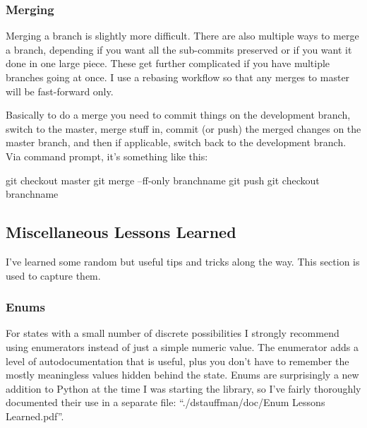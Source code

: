 \documentclass[12pt]{article}
\begin{document}
\subsubsection{Merging}
Merging a branch is slightly more difficult.  There are also multiple ways to merge a branch, depending if you want all the sub-commits preserved or if you want it done in one large piece.  These get further complicated if you have multiple branches going at once.  I use a rebasing workflow so that any merges to master will be fast-forward only.

Basically to do a merge you need to commit things on the development branch, switch to the master, merge stuff in, commit (or push) the merged changes on the master branch, and then if applicable, switch back to the development branch.  Via command prompt, it's something like this:
\begin{PlainText}
git checkout master
git merge --ff-only branchname
git push
git checkout branchname
\end{PlainText}

\subsection{Miscellaneous Lessons Learned}\label{h2:misc_lessons}
I've learned some random but useful tips and tricks along the way.  This section is used to capture them.

\subsubsection{Enums}
For states with a small number of discrete possibilities I strongly recommend using enumerators instead of just a simple numeric value.  The enumerator adds a level of autodocumentation that is useful, plus you don't have to remember the mostly meaningless values hidden behind the state.  Enums are surprisingly a new addition to Python at the time I was starting the library, so I've fairly thoroughly documented their use in a separate file: ``./dstauffman/doc/Enum Lessons Learned.pdf''.
\end{document}
